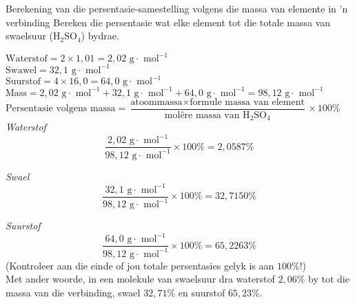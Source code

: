 \begin{wex}{Berekening van die persentasie-samestelling volgens die  massa van elemente in 'n verbinding}
{
Bereken die persentasie wat elke element tot die totale massa van swaelsuur (${\text{H}}_{2}{\text{SO}}_{4}$) bydrae.
}
{
$\text{Waterstof}=2 \times 1,01 = 2,02 \text{ g} \cdot \text{ mol}^{-1}$ \\ 
$\text{Swawel}=32,1 \text{ g} \cdot \text{ mol}^{-1}$ \\
$\text{Suurstof}=4 \times 16,0 = 64,0 \text{ g} \cdot \text{ mol}^{-1}$
$\text{Mass}=2,02 \text{ g} \cdot \text{ mol}^{-1} + 32,1 \text{ g} \cdot \text{ mol}^{-1} + 64,0 \text{ g} \cdot \text{ mol}^{-1} = 98,12 \text{ g} \cdot \text{ mol}^{-1}$
      \label{m38712*id280688}$\text{Persentasie volgens massa}=\dfrac{\text{atoommassa}\times \text{formule massa van element}}{\text{mol\^{e}re massa van H}{}_{2}\text{SO}{}_{4}} \times 100\%$ \\

        \textsl{Waterstof}      
      \label{m38712*id280735}\nopagebreak\noindent{}        
    \begin{equation*}
    \frac{2,02 \text{ g} \cdot \text{ mol}^{-1}}{98,12 \text{ g} \cdot \text{ mol}^{-1}}\ensuremath{\times}100\%=2,0587\%
      \end{equation*}

        \textsl{Swael}      
      \label{m38712*id280786}\nopagebreak\noindent{}        
    \begin{equation*}
    \frac{32,1 \text{ g} \cdot \text{ mol}^{-1}}{98,12 \text{ g} \cdot \text{ mol}^{-1}}\ensuremath{\times}100\%=32,7150\%
      \end{equation*}

        \textsl{Suurstof}     
      \label{m38712*id280837}\nopagebreak\noindent{}
    \begin{equation*}
    \frac{64,0 \text{ g} \cdot \text{ mol}^{-1}}{98,12 \text{ g} \cdot \text{ mol}^{-1}}\ensuremath{\times}100\%=65,2263\%
      \end{equation*}
      \label{m38712*id280876}(Kontroleer aan die einde of jou totale persentasies gelyk is aan $100\%$!) \\
      \label{m38712*id280880}Met ander woorde, in een molekule van swaelsuur dra waterstof $2,06\%$ by tot die massa van die verbinding, swael $32,71\%$ en suurstof $65,23\%$. 
}
    \end{wex}
